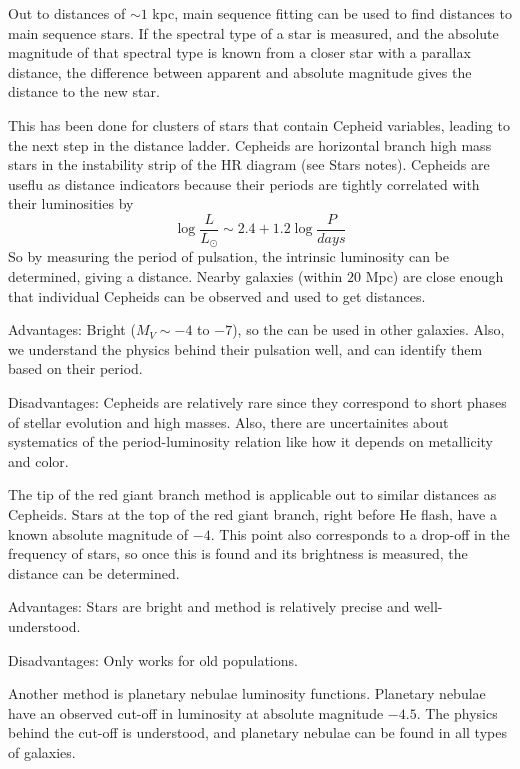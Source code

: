 Out to distances of $\sim1$ kpc, main sequence fitting can be used to find 
distances to main sequence stars.  If the spectral type of a star is measured, 
and the absolute magnitude of that spectral type is known from a closer 
star with a parallax distance, the difference between apparent and absolute 
magnitude gives the distance to the new star.  

This has been done for clusters of stars that contain Cepheid variables, 
leading to the next step in the distance ladder.  Cepheids are horizontal 
branch high mass stars in the instability strip of the HR diagram (see Stars 
notes).  Cepheids are useflu as distance indicators because their periods 
are tightly correlated with their luminosities by 
\begin{equation}
\log{\frac{L}{L_{\odot}}}\sim2.4+1.2\log{\frac{P}{days}}
\end{equation}
So by measuring the period of pulsation, the intrinsic luminosity can be 
determined, giving a distance.  Nearby galaxies (within $20$ Mpc) are close 
enough that individual Cepheids can be observed and used to get distances.  

Advantages:  Bright ($M_V\sim-4$ to $-7$), so the can be used in other galaxies.  
Also, we understand the physics behind their pulsation well, and can identify 
them based on their period.  

Disadvantages:  Cepheids are relatively rare since they correspond to short 
phases of stellar evolution and high masses.  Also, there are uncertainites 
about systematics of the period-luminosity relation like how it depends on 
metallicity and color.  

The tip of the red giant branch method is applicable out to similar distances 
as Cepheids.  Stars at the top of the red giant branch, right before He flash, 
have a known absolute magnitude of $-4$.  This point also corresponds to a 
drop-off in the frequency of stars, so once this is found and its brightness 
is measured, the distance can be determined.  

Advantages: Stars are bright and method is relatively precise and 
well-understood.  

Disadvantages:  Only works for old populations.  

Another method is planetary nebulae luminosity functions.  Planetary nebulae 
have an observed cut-off in luminosity at absolute magnitude $-4.5$.  The 
physics behind the cut-off is understood, and planetary nebulae can be found 
in all types of galaxies.  

